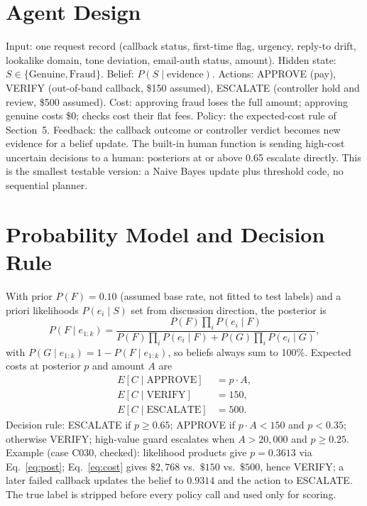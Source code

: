 \documentclass{article}
\begin{document}
\section{Agent Design}
Input: one request record (callback status, first-time flag, urgency, reply-to drift,
lookalike domain, tone deviation, email-auth status, amount). Hidden state:
$S \in \{\mathrm{Genuine}, \mathrm{Fraud}\}$. Belief: $P(S\mid\mathrm{evidence})$.
Actions: APPROVE (pay), VERIFY (out-of-band callback, \$150 assumed), ESCALATE
(controller hold and review, \$500 assumed). Cost: approving fraud loses the full
amount; approving genuine costs \$0; checks cost their flat fees. Policy: the
expected-cost rule of Section~5. Feedback: the callback outcome or controller verdict
becomes new evidence for a belief update. The built-in human function is sending
high-cost uncertain decisions to a human: posteriors at or above 0.65 escalate
directly. This is the smallest testable version: a Naive Bayes update plus threshold
code, no sequential planner.

\section{Probability Model and Decision Rule}
With prior $P(F)=0.10$ (assumed base rate, not fitted to test labels) and a priori
likelihoods $P(e_i\mid S)$ set from discussion direction, the posterior is
\begin{equation}
P(F\mid e_{1:k}) =
\frac{P(F)\prod_i P(e_i\mid F)}
{P(F)\prod_i P(e_i\mid F)+P(G)\prod_i P(e_i\mid G)},
\label{eq:post}
\end{equation}
with $P(G\mid e_{1:k})=1-P(F\mid e_{1:k})$, so beliefs always sum to 100\%.
Expected costs at posterior $p$ and amount $A$ are
\begin{equation}
\begin{aligned}
E[C\mid\mathrm{APPROVE}] &= p\cdot A,\\
E[C\mid\mathrm{VERIFY}] &= 150,\\
E[C\mid\mathrm{ESCALATE}] &= 500.
\end{aligned}
\label{eq:cost}
\end{equation}
Decision rule: ESCALATE if $p\ge 0.65$; APPROVE if $p\cdot A<150$ and $p<0.35$;
otherwise VERIFY; high-value guard escalates when $A>20{,}000$ and $p\ge 0.25$.
Example (case C030, checked): likelihood products give $p=0.3613$ via
Eq.~\ref{eq:post}; Eq.~\ref{eq:cost} gives $\$2{,}768$ vs.\ $\$150$ vs.\ $\$500$,
hence VERIFY; a later failed callback updates the belief to $0.9314$ and the action
to ESCALATE. The true label is stripped before every policy call and used only for
scoring.
\end{document}
